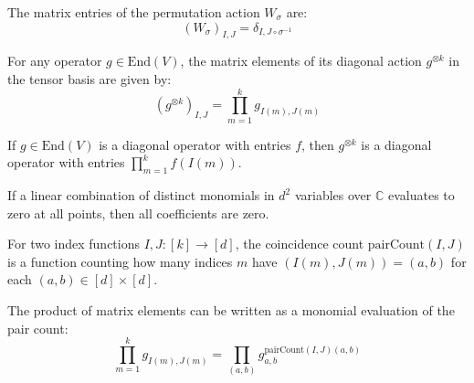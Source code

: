 \begin{lemma}\label{lem:toEndMatrix_permAction}
  \leanok
  The matrix entries of the permutation action $W_\sigma$ are:
  \begin{equation}
    (W_\sigma)_{I, J} = \delta_{I, J \circ \sigma^{-1}}
  \end{equation}
\end{lemma}

\begin{lemma}\label{lem:toEndMatrix_diagAction}
  \leanok
  For any operator $g \in \text{End}(V)$, the matrix elements of its diagonal action $g^{\otimes k}$ in the tensor basis are given by:
  \begin{equation}
    (g^{\otimes k})_{I, J} = \prod_{m=1}^k g_{I(m), J(m)}
  \end{equation}
\end{lemma}

\begin{lemma}\label{lem:diagAction_diagonal}
  \leanok
  If $g \in \text{End}(V)$ is a diagonal operator with entries $f$, then $g^{\otimes k}$ is a diagonal operator with entries $\prod_{m=1}^k f(I(m))$.
\end{lemma}

\begin{lemma}\label{lem:monomial_coeff_zero_of_eval_zero}
  \leanok
  If a linear combination of distinct monomials in $d^2$ variables over $\mathbb{C}$ evaluates to zero at all points, then all coefficients are zero.
\end{lemma}

\begin{definition}\label{def:pairCount}
  \leanok
  For two index functions $I, J: [k] \to [d]$, the coincidence count $\text{pairCount}(I, J)$ is a function counting how many indices $m$ have $(I(m), J(m)) = (a, b)$ for each $(a, b) \in [d] \times [d]$.
\end{definition}

\begin{lemma}\label{lem:prod_eq_monomial_eval}
  \leanok
  The product of matrix elements can be written as a monomial evaluation of the pair count:
  \begin{equation}
    \prod_{m=1}^k g_{I(m), J(m)} = \prod_{(a,b)} g_{a,b}^{\text{pairCount}(I,J)(a,b)}
  \end{equation}
\end{lemma}

